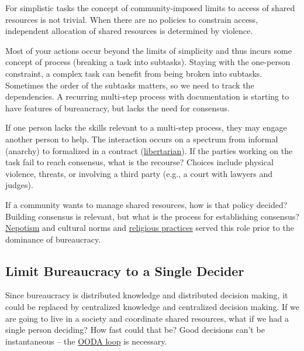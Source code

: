 For simplistic tasks the concept of community-imposed limits to access of \glspl{shared resource} is not trivial. When there are no policies to constrain access, independent allocation of shared resources is determined by violence.

Most of your actions occur beyond the limits of simplicity and thus incurs some concept of \gls{process} (breaking a task into subtasks). Staying with the one-person constraint, a complex task can benefit from being broken into subtasks. Sometimes the order of the subtasks matters, so we need to track the dependencies. A recurring multi-step process with documentation is starting to have features of bureaucracy, but lacks the need for consensus. 


If one person lacks the skills relevant to a multi-step process, they may engage another person to help. The interaction occurs on a spectrum from informal (anarchy) to formalized in a contract (\href{https://en.wikipedia.org/wiki/Libertarianism}{libertarian}).
If the parties working on the task fail to reach consensus, what is the recourse? Choices include physical violence, threats, or involving a third party (e.g., a court with lawyers and judges). 


If a community wants to manage shared resources, how is that policy decided?  Building consensus is relevant, but what is the process for establishing consensus? 
\href{https://en.wikipedia.org/wiki/Nepotism}{Nepotism} and
cultural norms and 
\href{https://en.wikipedia.org/wiki/Religion}{religious practices}
served this role prior to the dominance of bureaucracy. 


\subsection*{Limit Bureaucracy to a Single Decider\label{sec:single-decider}}

Since bureaucracy is distributed knowledge and distributed decision making, it could be replaced by centralized knowledge and centralized decision making. If we are going to live in a society and coordinate shared resources, what if we had a single person deciding? How fast could that be? Good decisions can't be instantaneous -- the 
\href{https://en.wikipedia.org/wiki/OODA_loop}{OODA loop} 
is necessary. 

